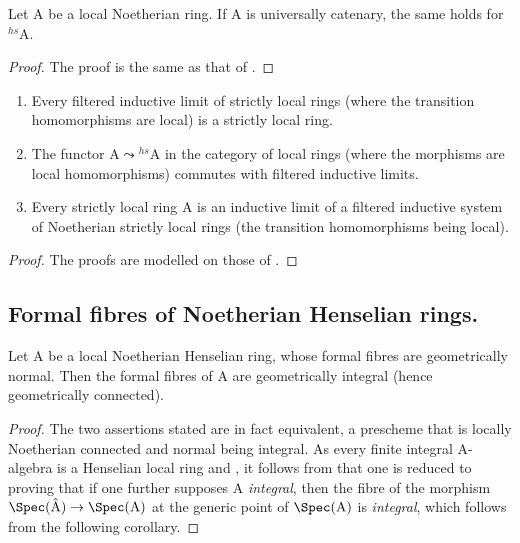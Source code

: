 \begin{proposition}[18.8.17]
\label{IV.18.8.17}
Let $\mathrm{A}$ be a local Noetherian ring.
If A is universally catenary, the same holds for ${}^{hs}\!\mathrm{A}$.
\end{proposition}

\begin{proof}
The proof is the same as that of .
\end{proof}

\begin{proposition}[18.8.18]
\label{IV.18.8.18}
\begin{enumerate}[label=\emph{\roman*)}]
  \item Every filtered inductive limit of strictly local rings (where the transition homomorphisms are local) is a strictly local ring.
  \item The functor $\mathrm{A}\leadsto{}^{hs}\!\mathrm{A}$ in the category of local rings (where the morphisms are local homomorphisms) commutes with filtered inductive limits.
  \item Every strictly local ring A is an inductive limit of a filtered inductive system of Noetherian strictly local rings (the transition homomorphisms being local).
\end{enumerate}
\end{proposition}

\begin{proof}
The proofs are modelled on those of .
\end{proof}



\subsection{Formal fibres of Noetherian Henselian rings.}
\label{subsection:IV.18.9}

\begin{theorem}[18.9.1]
\label{IV.18.9.1}
Let $\mathrm{A}$ be a local Noetherian Henselian ring, whose formal fibres are geometrically normal.
Then the formal fibres of $\mathrm{A}$ are geometrically integral (hence geometrically connected).
\end{theorem}

\begin{proof}
The two assertions stated are in fact equivalent, a prescheme that is locally Noetherian connected and normal being integral.
As every finite integral A-algebra is a Henselian local ring  and , it follows from  that one is reduced to proving that if one further supposes A \emph{integral}, then the fibre of the morphism $\Spec(\hat{\mathrm{A}})\to\Spec(\mathrm{A})$ at the generic point of $\Spec(\mathrm{A})$ is \emph{integral}, which follows from the following corollary.
\end{proof}

